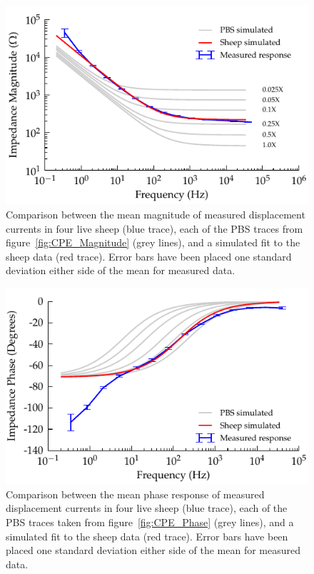 \documentclass[journal, a4paper]{IEEEtran}
\begin{document}
\begin{figure}
    \begin{center}
        \includegraphics{graphics/displacement-withSheep_impedanceVsFrequency_magnitude}
    \end{center}
    \caption{\color{blue} Comparison between the mean magnitude of measured displacement currents in four live sheep (blue trace), each of the PBS traces from figure~\ref{fig:CPE_Magnitude} (grey lines), and a simulated fit to the sheep data (red trace). Error bars have been placed one standard deviation either side of the mean for measured data.}
    \label{fig:displacement_sheepCPEMagnitude}
\end{figure}

\begin{figure}
    \begin{center}
        \includegraphics{graphics/displacement-withSheep_impedanceVsFrequency_phase}
    \end{center}
    \caption{\color{blue} Comparison between the mean phase response of measured displacement currents in four live sheep (blue trace), each of the PBS traces taken from figure~\ref{fig:CPE_Phase} (grey lines), and a simulated fit to the sheep data (red trace). Error bars have been placed one standard deviation either side of the mean for measured data.}
    \label{fig:displacement_sheepCPEPhase}
\end{figure}
\end{document}
